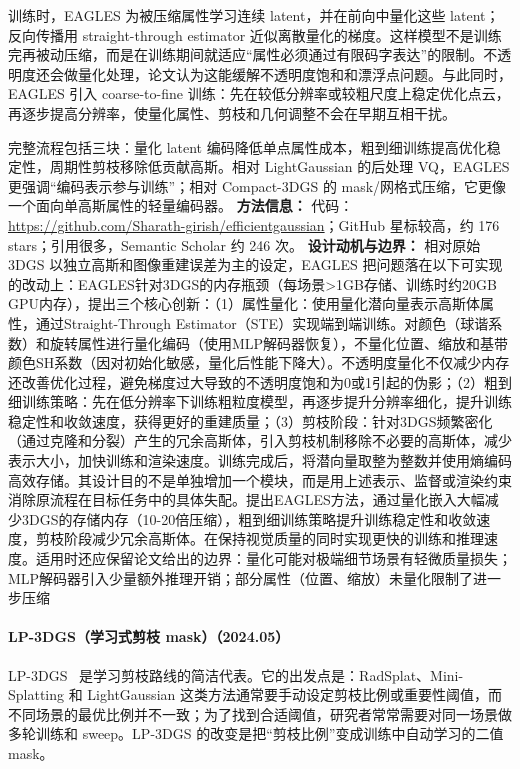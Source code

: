 训练时，EAGLES 为被压缩属性学习连续 latent，并在前向中量化这些 latent；反向传播用 straight-through estimator 近似离散量化的梯度。这样模型不是训练完再被动压缩，而是在训练期间就适应“属性必须通过有限码字表达”的限制。不透明度还会做量化处理，论文认为这能缓解不透明度饱和和漂浮点问题。与此同时，EAGLES 引入 coarse-to-fine 训练：先在较低分辨率或较粗尺度上稳定优化点云，再逐步提高分辨率，使量化属性、剪枝和几何调整不会在早期互相干扰。

完整流程包括三块：量化 latent 编码降低单点属性成本，粗到细训练提高优化稳定性，周期性剪枝移除低贡献高斯。相对 LightGaussian 的后处理 VQ，EAGLES 更强调“编码表示参与训练”；相对 Compact-3DGS 的 mask/网格式压缩，它更像一个面向单高斯属性的轻量编码器。
\textbf{方法信息：} 代码：\url{https://github.com/Sharath-girish/efficientgaussian}；GitHub 星标较高，约 176 stars；引用很多，Semantic Scholar 约 246 次。
\textbf{设计动机与边界：} 相对原始 3DGS 以独立高斯和图像重建误差为主的设定，EAGLES 把问题落在以下可实现的改动上：EAGLES针对3DGS的内存瓶颈（每场景>1GB存储、训练时约20GB GPU内存），提出三个核心创新：（1）属性量化：使用量化潜向量表示高斯体属性，通过Straight-Through Estimator（STE）实现端到端训练。对颜色（球谐系数）和旋转属性进行量化编码（使用MLP解码器恢复），不量化位置、缩放和基带颜色SH系数（因对初始化敏感，量化后性能下降大）。不透明度量化不仅减少内存还改善优化过程，避免梯度过大导致的不透明度饱和为0或1引起的伪影；（2）粗到细训练策略：先在低分辨率下训练粗粒度模型，再逐步提升分辨率细化，提升训练稳定性和收敛速度，获得更好的重建质量；（3）剪枝阶段：针对3DGS频繁密化（通过克隆和分裂）产生的冗余高斯体，引入剪枝机制移除不必要的高斯体，减少表示大小，加快训练和渲染速度。训练完成后，将潜向量取整为整数并使用熵编码高效存储。其设计目的不是单独增加一个模块，而是用上述表示、监督或渲染约束消除原流程在目标任务中的具体失配。提出EAGLES方法，通过量化嵌入大幅减少3DGS的存储内存（10-20倍压缩），粗到细训练策略提升训练稳定性和收敛速度，剪枝阶段减少冗余高斯体。在保持视觉质量的同时实现更快的训练和推理速度。适用时还应保留论文给出的边界：量化可能对极端细节场景有轻微质量损失；MLP解码器引入少量额外推理开销；部分属性（位置、缩放）未量化限制了进一步压缩
\paragraph{LP-3DGS（学习式剪枝 mask）（2024.05）}
LP-3DGS~\cite{2405_18784} 是学习剪枝路线的简洁代表。它的出发点是：RadSplat、Mini-Splatting 和 LightGaussian 这类方法通常要手动设定剪枝比例或重要性阈值，而不同场景的最优比例并不一致；为了找到合适阈值，研究者常常需要对同一场景做多轮训练和 sweep。LP-3DGS 的改变是把“剪枝比例”变成训练中自动学习的二值 mask。

